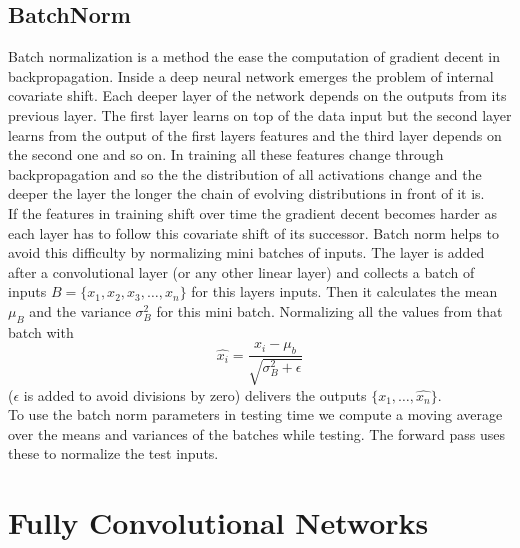 \subsection{BatchNorm} %
\label{sub:conepts:nn:batchnorm}
Batch normalization \citep{ioffe_batch_2015} is a method the ease the computation of gradient decent in backpropagation. Inside a deep neural network emerges the problem of internal covariate shift. Each deeper layer of the network depends on the outputs from its previous layer. The first layer learns on top of the data input but the second layer learns from the output of the first layers features and the third layer depends on the second one and so on. In training all these features change through backpropagation and so the the distribution of all activations change and the deeper the layer the longer the chain of evolving distributions in front of it is.\\
If the features in training shift over time the gradient decent becomes harder as each layer has to follow this covariate shift of its successor. Batch norm helps to avoid this difficulty by normalizing mini batches of inputs. The layer is added after a convolutional layer (or any other linear layer) and collects a batch of inputs $B = \{x_1, x_2, x_3, \dots, x_n\}$ for this layers inputs. Then it calculates the mean $\mu_B$ and the variance $\sigma_B^2$ for this mini batch. Normalizing all the values from that batch  with $$\hat{x_i} = \frac{x_i - \mu_b}{\sqrt{\sigma_B^2 + \epsilon}}$$ ($\epsilon$ is added to avoid divisions by zero) delivers the outputs $\{\hat{x_1},\dots,\hat{x_n}\}$.\\
To use the batch norm parameters in testing time we compute a moving average over the means and variances of the batches while testing. The forward pass uses these to normalize the test inputs.

\section{Fully Convolutional Networks}
\label{sec:concepts:fcn}

